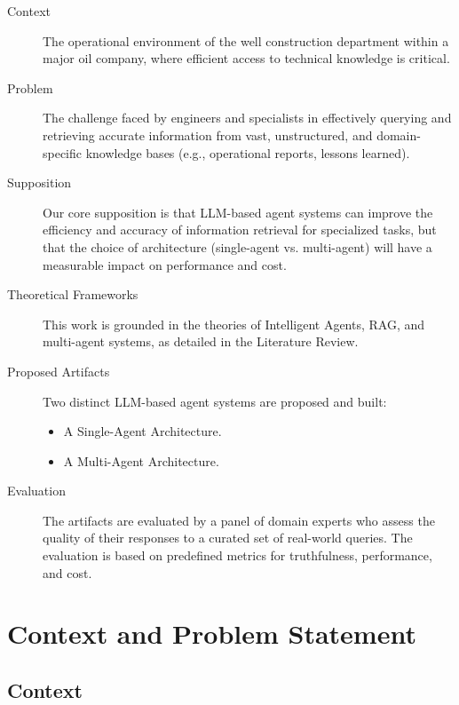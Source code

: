         \begin{description}
            \item[Context] The operational environment of the well construction department within a major oil company, where efficient access to technical knowledge is critical.

            \item[Problem] The challenge faced by engineers and specialists in effectively querying and retrieving accurate information from vast, unstructured, and domain-specific knowledge bases (e.g., operational reports, lessons learned).

            \item[Supposition] Our core supposition is that LLM-based agent systems can improve the efficiency and accuracy of information retrieval for specialized tasks, but that the choice of architecture (single-agent vs. multi-agent) will have a measurable impact on performance and cost.

            \item[Theoretical Frameworks] This work is grounded in the theories of Intelligent Agents, RAG, and multi-agent systems, as detailed in the Literature Review.

            \item[Proposed Artifacts] Two distinct LLM-based agent systems are proposed and built:
            \begin{itemize}
                \item A Single-Agent Architecture.
                \item A Multi-Agent Architecture.
            \end{itemize}

            \item[Evaluation] The artifacts are evaluated by a panel of domain experts who assess the quality of their responses to a curated set of real-world queries. The evaluation is based on predefined metrics for truthfulness, performance, and cost.
        \end{description}

    \section{Context and Problem Statement}

        \subsection{Context}

